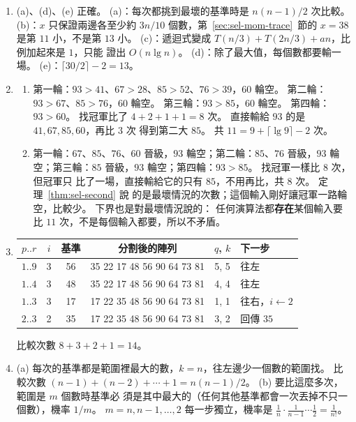 \begin{enumerate}
\item (a)、(d)、(e) 正確。 (a)：每次都挑到最壞的基準時是 $n(n-1)/2$ 次比較。 (b)：$x$
只保證兩邊各至少約 $3n/10$ 個數，第~\ref{sec:sel-mom-trace}~節的 $x = 38$ 是第 $11$
小，不是第 $13$ 小。 (c)：遞迴式變成 $T(n/3) + T(2n/3) + an$，比例加起來是 $1$，只能
證出 $O(n \lg n)$。 (d)：除了最大值，每個數都要輸一場。 (e)：$\lceil 30/2 \rceil - 2 = 13$。

\item
\begin{enumerate}
\item 第一輪：$93 > 41$、$67 > 28$、$85 > 52$、$76 > 39$，$60$ 輪空。 第二輪：
$93 > 67$、$85 > 76$，$60$ 輪空。 第三輪：$93 > 85$，$60$ 輪空。 第四輪：$93 > 60$。
找冠軍比了 $4 + 2 + 1 + 1 = 8$ 次。 直接輸給 $93$ 的是 $41, 67, 85, 60$，再比 $3$ 次
得到第二大 $85$。 共 $11 = 9 + \lceil \lg 9 \rceil - 2$ 次。
\item 第一輪：$67$、$85$、$76$、$60$ 晉級，$93$ 輪空；第二輪：$85$、$76$ 晉級，$93$
輪空；第三輪：$85$ 晉級，$93$ 輪空；第四輪：$93 > 85$。 找冠軍一樣比 $8$ 次，但冠軍只
比了一場，直接輸給它的只有 $85$，不用再比，共 $8$ 次。 定理~\ref{thm:sel-second} 說
的是最壞情況的次數；這個輸入剛好讓冠軍一路輪空，比較少。 下界也是對最壞情況說的：
任何演算法都\textbf{存在}某個輸入要比 $11$ 次，不是每個輸入都要，所以不矛盾。
\end{enumerate}

\item
\begin{center}
\begin{tabular}{cccccl}
\toprule
$p..r$ & $i$ & 基準 & 分割後的陣列 & $q$, $k$ & 下一步 \\
\midrule
$1..9$ & 3 & 56 & 35 22 17 48 56 90 64 73 81 & 5, 5 & 往左 \\
$1..4$ & 3 & 48 & 35 22 17 48 56 90 64 73 81 & 4, 4 & 往左 \\
$1..3$ & 3 & 17 & 17 22 35 48 56 90 64 73 81 & 1, 1 & 往右，$i \gets 2$ \\
$2..3$ & 2 & 35 & 17 22 35 48 56 90 64 73 81 & 3, 2 & 回傳 $35$ \\
\bottomrule
\end{tabular}
\end{center}
比較次數 $8 + 3 + 2 + 1 = 14$。

\item (a) 每次的基準都是範圍裡最大的數，$k = n$，往左邊少一個數的範圍找。 比較次數
$(n-1) + (n-2) + \cdots + 1 = n(n-1)/2$。 (b) 要比這麼多次，範圍是 $m$ 個數時基準必
須是其中最大的（任何其他基準都會一次丟掉不只一個數），機率 $1/m$。 $m = n, n-1,
\ldots, 2$ 每一步獨立，機率是 $\frac{1}{n} \cdot \frac{1}{n-1} \cdots \frac{1}{2} =
\frac{1}{n!}$。


\end{enumerate}
